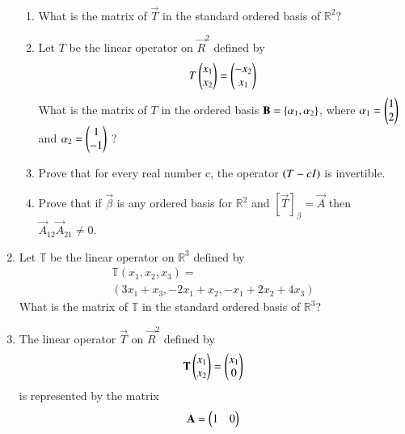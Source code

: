 \begin{enumerate}[label=\thesubsection.\arabic*.,ref=\thesubsection.\theenumi]
\begin{align}
\end{align}
\begin{enumerate}
\item What is the matrix of $\vec{T}$ in the standard ordered basis of $\mathbb{R}^2$?
%
\\
\solution

\item  	Let $T$ be the linear operator on $\vec{R}^2$ defined by 
	\begin{align}
		T\begin{pmatrix}x_1\\ x_2\end{pmatrix} = \begin{pmatrix}-x_2\\ x_1\end{pmatrix} 
	\end{align}
	What is the matrix of $T$ in the ordered basis $\mathbf{B} = \left\{ \mathbf{ \alpha }_1, \mathbf{\alpha}_2\right\}$, where $\mathbf{\alpha}_1 = \begin{pmatrix}1\\ 2\end{pmatrix}$ and $\mathbf{\alpha}_2 = \begin{pmatrix}1 \\ -1\end{pmatrix}$ ?
%
\\
\solution

\item Prove that for every real number c, the operator $\left(T-cI\right)$ is invertible.
%
\\
\solution

\item Prove that if $\vec{\beta}$ is any ordered basis for $\mathbb{R}^2$ and $[\vec{T}]_\beta = \vec{A}$ then $\vec{A}_{12}\vec{A}_{21} \neq 0$.  
%
\\
\solution

\end{enumerate}
\item Let $\mathbb{T}$ be the linear operator on $\mathbb{R}^3$ defined by 
\begin{align}
    \mathbb{T}(x_1,x_2,x_3)=\\(3x_1+x_3,-2x_1+x_2,-x_1+2x_2+4x_3)\label{eq:solutions/3/4/7/a/1}
\end{align}
What is the matrix of $\mathbb{T}$ in the standard ordered basis of $\mathbb{R}^3$?
%
\\
\solution

\item The linear operator $\vec{T}$ on $\vec{R}^2$ defined by 
\begin{align}
	\mathbf{T}\begin{pmatrix}x_1\\x_2\end{pmatrix}=\begin{pmatrix}x_1\\0\end{pmatrix}
\end{align}
is represented by the matrix
\begin{align}
	\mathbf{A}=\begin{pmatrix}1&0\\
\end{pmatrix}
\end{align}
\end{enumerate}
